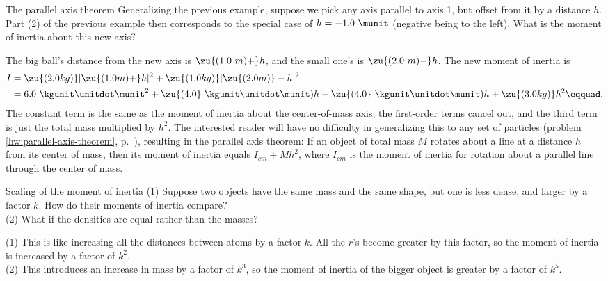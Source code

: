 \begin{eg}{The parallel axis theorem}
\egquestion
Generalizing the previous example, suppose we pick
any axis parallel to axis 1, but offset from it by a
distance $h$. Part (2) of the previous example then
corresponds to the special case of $h=- 1.0\ \munit$ (negative being
to the left). What is the moment of inertia about this new
axis?

\eganswer
The big ball's distance from the new axis is 
$\zu{(1.0\ m)+} h$, and the small one's is $\zu{(2.0\ m)-} h$. The new moment of
inertia is
\begin{align*}
         I        &=  \zu{(2.0 kg)}[\zu{(1.0 m)+} h]^2 + \zu{(1.0 kg)}[\zu{(2.0 m)}- h]^2 \\
                &        =   6.0 \ \kgunit\unitdot\munit^2         
                        + \zu{(4.0}\ \kgunit\unitdot\munit) h
                        - \zu{(4.0}\ \kgunit\unitdot\munit) h
                        + \zu{(3.0 kg)} h^2\eqquad.
\end{align*}
The constant term is the same as the moment of inertia about
the center-of-mass axis, the first-order terms cancel out,
and the third term is just the total mass multiplied by $h^2$.
The interested reader will have no difficulty in
generalizing this to any set of particles (problem \ref{hw:parallel-axis-theorem}, p.~\pageref{hw:parallel-axis-theorem}), resulting in the
parallel axis theorem:
 If an object of total mass $M$ rotates
about a line at a distance $h$ from its center of mass, then
its moment of inertia equals $I_{cm}+ Mh^2$, where $I_{cm}$ is the
moment of inertia for rotation about a parallel line through
the center of mass.
\end{eg}

\begin{eg}{Scaling of the moment of inertia}
\egquestion
(1) Suppose two objects have the same mass and the
same shape, but one is less dense, and larger by a factor $k$.
How do their moments of inertia compare? \\
(2) What if the
densities are equal rather than the masses?

\eganswer
(1) This is like increasing all the distances
between atoms by a factor $k$. All the $r$'s become greater by
this factor, so the moment of inertia is increased by a
factor of $k^2$.\\
(2) This introduces an increase in mass by a
factor of $k^3$, so the moment of inertia of the bigger object
is greater by a factor of $k^5$.
\end{eg}

